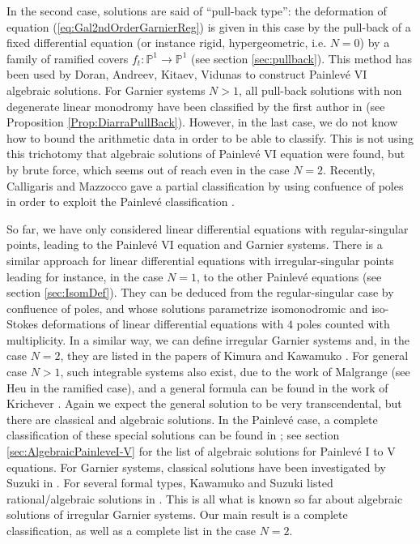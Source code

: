 \documentclass[12]{amsart}
\begin{document}
In the second case, solutions are said of ``pull-back type'': the deformation of equation (\ref{eq:Gal2ndOrderGarnierReg})
is given in this case by the pull-back of a fixed differential equation (or instance rigid, hypergeometric, i.e. $N=0$)
by a family of ramified covers $f_t:\mathbb P^1\to\mathbb P^1$ (see section \ref{sec:pullback}). This method
has been used by Doran, Andreev, Kitaev, Vidunas to construct Painlev\'e VI algebraic solutions. For Garnier
systems $N>1$, all pull-back solutions with non degenerate linear monodromy have been classified by the first author 
in \cite{Diarra1} (see Proposition \ref{Prop:DiarraPullBack}). However, in the last case, we do not know
how to bound the arithmetic data in order to be able to classify. This is not using this trichotomy that 
algebraic solutions of Painlev\'e VI equation were found, but by brute force, which seems out of reach 
even in the case $N=2$. Recently, Calligaris and Mazzocco \cite{CM} gave a partial classification 
by using confuence of poles in order to exploit the Painlev\'e classification \cite{LisovyyTykhyy}.

So far, we have only considered linear differential equations with regular-singular points,
leading to the Painlev\'e VI equation and Garnier systems. There is a similar approach
for linear differential equations with irregular-singular points leading for instance, in the case $N=1$,
to the other Painlev\'e equations (see section \ref{sec:IsomDef}). They can be deduced from 
the regular-singular case by confluence of poles, and whose solutions parametrize isomonodromic and 
iso-Stokes deformations of linear differential equations with $4$ poles counted with multiplicity.
In a similar way, we can define irregular Garnier systems and, in the case $N=2$, they are listed
in the papers of Kimura \cite{Kimura} and Kawamuko \cite{Kawamuko}. For general case $N>1$,
such integrable systems also exist, due to the work of Malgrange (see Heu \cite{Heu} in the ramified case),
and a general formula can be found in the work of Krichever \cite{Krichever}.
Again we expect the general solution to be very transcendental, but there are classical and algebraic solutions.
In the Painlev\'e case, a complete classification of these special solutions can be found in \cite{OO};
see section \ref{sec:AlgebraicPainleveI-V} for the list of algebraic solutions for Painlev\'e I to V equations.
For Garnier systems, classical solutions have been investigated by Suzuki in \cite{Suzuki}. 
For several formal types, Kawamuko and Suzuki listed rational/algebraic solutions in \cite{KawamukoRat,Suzuki,KawamukoAlg}. 
This is all what is known so far about algebraic solutions of irregular Garnier systems. 
Our main result is a complete classification, as well as a complete list in the case $N=2$.
\end{document}
